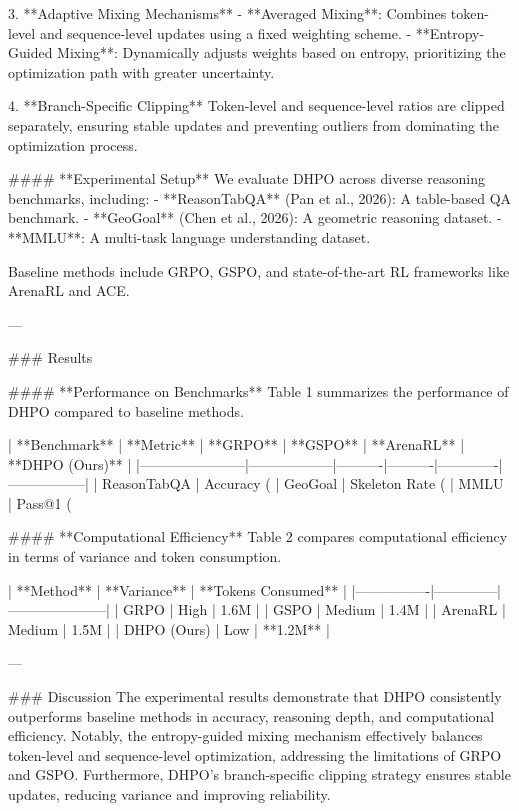 3. **Adaptive Mixing Mechanisms**  
   - **Averaged Mixing**: Combines token-level and sequence-level updates using a fixed weighting scheme.
   - **Entropy-Guided Mixing**: Dynamically adjusts weights based on entropy, prioritizing the optimization path with greater uncertainty.

4. **Branch-Specific Clipping**  
   Token-level and sequence-level ratios are clipped separately, ensuring stable updates and preventing outliers from dominating the optimization process.

#### **Experimental Setup**  
We evaluate DHPO across diverse reasoning benchmarks, including:
- **ReasonTabQA** (Pan et al., 2026): A table-based QA benchmark.
- **GeoGoal** (Chen et al., 2026): A geometric reasoning dataset.
- **MMLU**: A multi-task language understanding dataset.

Baseline methods include GRPO, GSPO, and state-of-the-art RL frameworks like ArenaRL and ACE.

---

### Results  

#### **Performance on Benchmarks**  
Table 1 summarizes the performance of DHPO compared to baseline methods.

| **Benchmark**         | **Metric**       | **GRPO** | **GSPO** | **ArenaRL** | **DHPO (Ours)** |
|-----------------------|------------------|----------|----------|-------------|-----------------|
| ReasonTabQA           | Accuracy (%
| GeoGoal               | Skeleton Rate (%
| MMLU                  | Pass@1 (%

#### **Computational Efficiency**  
Table 2 compares computational efficiency in terms of variance and token consumption.

| **Method**     | **Variance** | **Tokens Consumed** |
|----------------|--------------|---------------------|
| GRPO           | High         | 1.6M               |
| GSPO           | Medium       | 1.4M               |
| ArenaRL        | Medium       | 1.5M               |
| DHPO (Ours)    | Low          | **1.2M**           |

---

### Discussion  
The experimental results demonstrate that DHPO consistently outperforms baseline methods in accuracy, reasoning depth, and computational efficiency. Notably, the entropy-guided mixing mechanism effectively balances token-level and sequence-level optimization, addressing the limitations of GRPO and GSPO. Furthermore, DHPO's branch-specific clipping strategy ensures stable updates, reducing variance and improving reliability.

